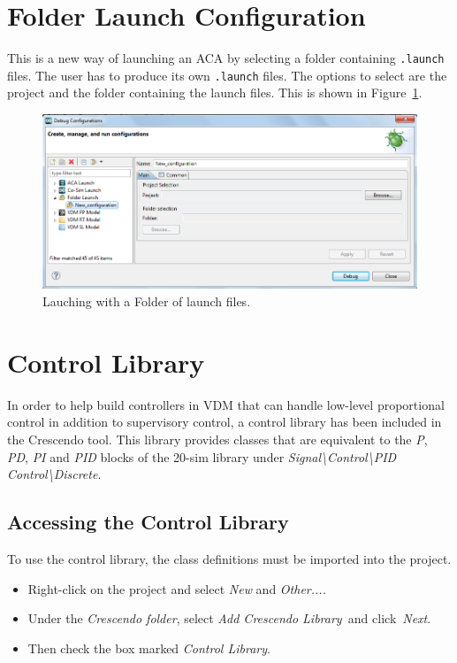 \documentclass{crescendorepchap}
\begin{document}
\section{Folder Launch Configuration}

This is a new way of launching
an ACA by selecting a folder containing \texttt{.launch} files. The user has to
produce its own \texttt{.launch} files. The options to select are the project
and the folder containing the launch files. This is shown in Figure~\ref{fig:dirlaunch}.

\begin{figure}[htbp]
\centering
\includegraphics[width=.6\textwidth]{images/GeneratedLaunch.png}
\caption{Lauching with a Folder of launch files.\label{fig:dirlaunch}}
\end{figure}

\section{Control Library}

In order to help build controllers in VDM that can handle low-level
proportional control in addition to supervisory control, a control
library has been included in the Crescendo tool. This library provides
classes that are equivalent to the \emph{P}, \emph{PD}, \emph{PI}
and \emph{PID} blocks of the 20-sim library under
\emph{Signal\textbackslash{}Control\textbackslash{}PID
Control\textbackslash{}Discrete}.

\subsection{Accessing the Control Library}

To use the control library, the class definitions must be imported into
the project.

\begin{itemize}
\item
  Right-click on the project and select \emph{New} and \emph{Other....}
\item
  Under the \emph{Crescendo folder}, select \emph{Add Crescendo
  Library~}and click~\emph{Next}.
\item
  Then check the box marked \emph{Control Library}.
\end{itemize}
\end{document}
